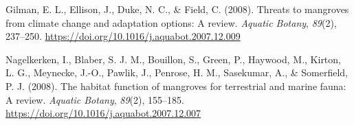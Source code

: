 \documentclass[
  12pt,
]{article}
\newlength{\cslhangindent}
\newlength{\cslentryspacingunit} %
\newenvironment{CSLReferences}[2] %
 {%
  \setlength{\parindent}{0pt}
  \ifodd #1
  \let\oldpar\par
  \def\par{\hangindent=\cslhangindent\oldpar}
  \fi
  \setlength{\parskip}{#2\cslentryspacingunit}
 }%
 {}
\begin{document}
\begin{CSLReferences}{1}{2}
\leavevmode{}%
Gilman, E. L., Ellison, J., Duke, N. C., \& Field, C. (2008). Threats to mangroves from climate change and adaptation options: {A} review. \emph{Aquatic Botany}, \emph{89}(2), 237--250. \url{https://doi.org/10.1016/j.aquabot.2007.12.009}

\leavevmode{}%
Nagelkerken, I., Blaber, S. J. M., Bouillon, S., Green, P., Haywood, M., Kirton, L. G., Meynecke, J.-O., Pawlik, J., Penrose, H. M., Sasekumar, A., \& Somerfield, P. J. (2008). The habitat function of mangroves for terrestrial and marine fauna: {A} review. \emph{Aquatic Botany}, \emph{89}(2), 155--185. \url{https://doi.org/10.1016/j.aquabot.2007.12.007}

\end{CSLReferences}
\end{document}
